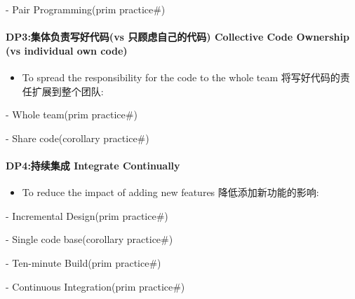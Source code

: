 \begin{description}
\tightlist
\item[]
- Pair Programming(prim practice\#)
\end{description}

\hypertarget{dp3ux96c6ux4f53ux8d1fux8d23ux5199ux597dux4ee3ux7801vs-ux53eaux987eux8651ux81eaux5df1ux7684ux4ee3ux7801-collective-code-ownership-vs-individual-own-code}{%
\paragraph{DP3:集体负责写好代码(vs 只顾虑自己的代码) Collective Code
Ownership (vs individual own
code)}\label{dp3ux96c6ux4f53ux8d1fux8d23ux5199ux597dux4ee3ux7801vs-ux53eaux987eux8651ux81eaux5df1ux7684ux4ee3ux7801-collective-code-ownership-vs-individual-own-code}}

\begin{itemize}
\tightlist
\item
  To spread the responsibility for the code to the whole team
  将写好代码的责任扩展到整个团队:\\
\end{itemize}

\begin{description}
\tightlist
\item[]
- Whole team(prim practice\#)

- Share code(corollary practice\#)
\end{description}

\hypertarget{dp4ux6301ux7eedux96c6ux6210-integrate-continually}{%
\paragraph{DP4:持续集成 Integrate
Continually}\label{dp4ux6301ux7eedux96c6ux6210-integrate-continually}}

\begin{itemize}
\tightlist
\item
  To reduce the impact of adding new features 降低添加新功能的影响:
\end{itemize}

\begin{description}
\tightlist
\item[]
- Incremental Design(prim practice\#)

- Single code base(corollary practice\#)

- Ten-minute Build(prim practice\#)

- Continuous Integration(prim practice\#)
\end{description}

